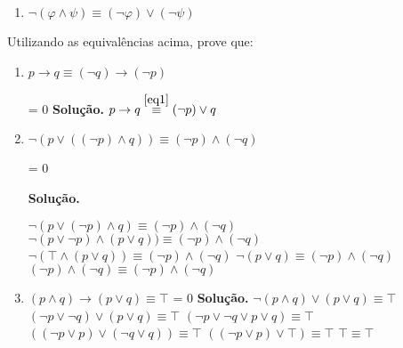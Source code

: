\documentclass[a4paper]{article}
\newcommand{\answer}[2]{\ifnum#1= 0  {\color{blue} #2}\else \fi}
\begin{document}
\begin{enumerate}
\begin{enumerate}[label*=\arabic*.]
  \item\label{eq20} $\neg{}(\varphi \land \psi) \equiv (\neg{} \varphi) \lor (\neg{} \psi)$
  \end{enumerate}
  
  Utilizando as equivalências acima, prove que:
  
  
  \begin{enumerate}
  \item $p \to q \equiv (\neg{} q) \to (\neg{} p)$
    
    \answer{0}{
      {\bf Solução.}
      $p \to q \stackrel{\ref{eq1}}{\equiv} (\neg p) \lor q$
    }
    
  \item $\neg{}(p \lor ((\neg{} p) \land q)) \equiv (\neg{} p)\land (\neg{} q)$ \newline
    
    \answer{0}{ {\bf Solução.}
      
      $\neg{}(p \lor (\neg{} p) \land q) \equiv (\neg{} p) \land
      (\neg{} q)$ \newline
      $\neg{}(p \lor \neg{} p) \land (p \lor q)) \equiv (\neg{}
      p)\land (\neg{} q)$ \newline
      $\neg{}(\top \land(p \lor q)) \equiv (\neg{} p) \land (\neg{}
      q)$ \newline
      $\neg{}(p \lor q) \equiv (\neg{} p) \land (\neg{} q)$ \newline
      $(\neg{}p) \land (\neg{}q) \equiv (\neg{} p) \land (\neg{} q)$
      \newline }
\item $(p \land q) \to (p \lor q) \equiv \top$ \newline
	\answer{0}{
    {\bf Solução.}\newline
    $\neg{}(p \land q) \lor (p \lor q)\equiv \top $ \newline
    $(\neg{}p \lor \neg{}q) \lor (p \lor q) \equiv \top$ \newline
    $(\neg{}p \lor \neg{}q \lor p \lor q) \equiv \top$ \newline
    $((\neg{}p \lor p) \lor (\neg{}q \lor q)) \equiv \top$ \newline
    $((\neg{}p \lor p) \lor \top) \equiv \top$ \newline
    $ \top \equiv \top$
    }
	

\end{enumerate}
\end{enumerate}
\end{document}
